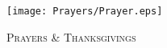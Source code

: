 \fancyhead[RE,LO]{}\fancyhead[RO,LE]{}
\fancyhead[C]{}\thispagestyle{empty}
{}

\begin{figure}[H]
    \centering
    \texttt{[image: Prayers/Prayer.eps]}
    \caption{\textsc{\Huge{Prayers \& Thanksgivings}}}
\end{figure}